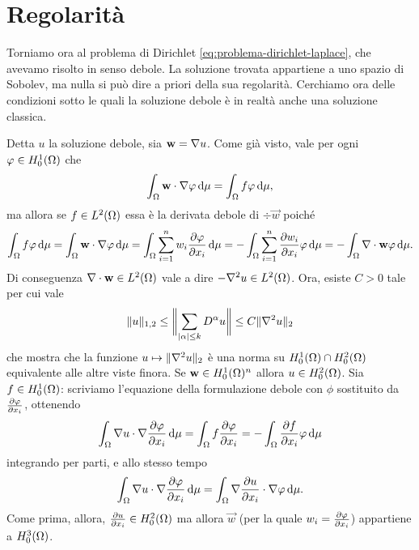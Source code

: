 \section{Regolarità}
Torniamo ora al problema di Dirichlet \eqref{eq:problema-dirichlet-laplace}, che avevamo risolto in senso debole.
La soluzione trovata appartiene a uno spazio di Sobolev, ma nulla si può dire a priori della sua regolarità.
Cerchiamo ora delle condizioni sotto le quali la soluzione debole è in realtà anche una soluzione classica.

Detta $u$ la soluzione debole, sia $\vec w=\grad u$.
Come già visto, vale per ogni $\phi\in\sobHc[1]{\Omega}$ che
\begin{equation}
    \int_\Omega\scalar{\vec w}{\grad\phi}\,\dd\mu=\int_\Omega f\phi\,\dd\mu,
\end{equation}
ma allora se $f\in\leb[2]{\Omega}$ essa è la derivata debole di $\div\vec w$ poich\'e
\begin{equation}
    \int_\Omega f\phi\,\dd\mu=
    \int_\Omega\scalar{\vec w}{\grad\phi}\,\dd\mu=
    \int_\Omega\sum_{i=1}^nw_i\drp{\phi}{x_i}\,\dd\mu=
    -\int_\Omega\sum_{i=1}^n\drp{w_i}{x_i}\phi\,\dd\mu=
    -\int_\Omega\div\vec w\phi\,\dd\mu.
\end{equation}
Di conseguenza $\div\vec w\in\leb[2]{\Omega}$ vale a dire $-\lap u\in\leb[2]{\Omega}$.
Ora, esiste $C>0$ tale per cui vale
\begin{equation}
    \norm{u}_{1,2}\le
    \norm[\bigg]{\sum_{\abs{\alpha}\le k}D^\alpha u}\le
    C\norm{\lap u}_2
\end{equation}
che mostra che la funzione $u\mapsto\norm{\lap u}_2$ è una norma su $\sobHc[1]{\Omega}\cap\sobHc[2]{\Omega}$ equivalente alle altre viste finora.
Se $\vec w\in\sobHc[1]{\Omega}^n$ allora $u\in\sobHc[2]{\Omega}$.
Sia $f\in\sobHc[1]{\Omega}$: scriviamo l'equazione della formulazione debole con $\phi$ sostituito da $\drp{\phi}{x_i}$, ottenendo
\begin{equation}
    \int_\Omega\scalar{\grad u}{\grad\drp{\phi}{x_i}}\,\dd\mu=
    \int_\Omega f\drp{\phi}{x_i}=
    -\int_\Omega \drp{f}{x_i}\phi\,\dd\mu
\end{equation}
integrando per parti, e allo stesso tempo
\begin{equation}
    \int_\Omega\scalar{\grad u}{\grad\drp{\phi}{x_i}}\,\dd\mu=
    \int_\Omega\scalar{\grad\drp{u}{x_i}}{\grad\phi}\,\dd\mu.
\end{equation}
Come prima, allora, $\drp{u}{x_i}\in\sobHc[2]{\Omega}$ ma allora $\vec w$ (per la quale $w_i=\drp{\phi}{x_i}$) appartiene a $\sobHc[3]{\Omega}$.
